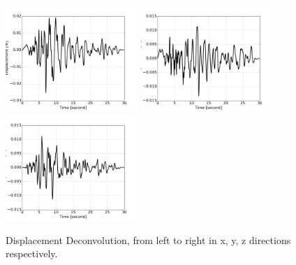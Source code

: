 \begin{figure}[H]
  \centering
  \includegraphics[width = 5cm]{./Figure-files/Day1/Nuclear_Power_Plant_with_3by1D_motions_from_Deconvolution/scaled_NORTHR_x_D.jpg}
  \includegraphics[width = 5cm]{./Figure-files/Day1/Nuclear_Power_Plant_with_3by1D_motions_from_Deconvolution/scaled_NORTHR_y_D.jpg}
  \includegraphics[width = 5cm]{./Figure-files/Day1/Nuclear_Power_Plant_with_3by1D_motions_from_Deconvolution/scaled_NORTHR_z_D.jpg}
  \caption{Displacement Deconvolution, from left to right in x, y, z directions respectively. }
  \label{fig_motion_deconvolution3}
\end{figure}


